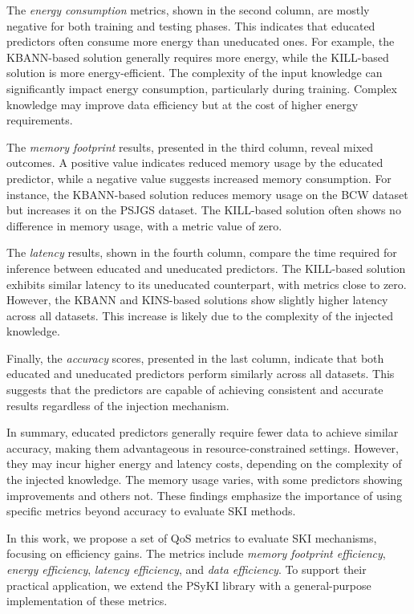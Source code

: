 The \emph{energy consumption} metrics, shown in the second column, are mostly negative for both training and testing phases.
%
This indicates that educated predictors often consume more energy than uneducated ones.
%
For example, the \gls{KBANN}-based solution generally requires more energy, while the \gls{KILL}-based solution is more energy-efficient.
%
The complexity of the input knowledge can significantly impact energy consumption, particularly during training.
%
Complex knowledge may improve data efficiency but at the cost of higher energy requirements.

%
The \emph{memory footprint} results, presented in the third column, reveal mixed outcomes.
%
A positive value indicates reduced memory usage by the educated predictor, while a negative value suggests increased memory consumption.
%
For instance, the \gls{KBANN}-based solution reduces memory usage on the \gls{BCW} dataset but increases it on the \gls{PSJGS} dataset.
%
The \gls{KILL}-based solution often shows no difference in memory usage, with a metric value of zero.

%
The \emph{latency} results, shown in the fourth column, compare the time required for inference between educated and uneducated predictors.
%
The \gls{KILL}-based solution exhibits similar latency to its uneducated counterpart, with metrics close to zero.
%
However, the \gls{KBANN} and \gls{KINS}-based solutions show slightly higher latency across all datasets.
%
This increase is likely due to the complexity of the injected knowledge.

%
Finally, the \emph{accuracy} scores, presented in the last column, indicate that both educated and uneducated predictors perform similarly across all datasets.
%
This suggests that the predictors are capable of achieving consistent and accurate results regardless of the injection mechanism.

%
In summary, educated predictors generally require fewer data to achieve similar accuracy, making them advantageous in resource-constrained settings.
%
However, they may incur higher energy and latency costs, depending on the complexity of the injected knowledge.
%
The memory usage varies, with some predictors showing improvements and others not.
%
These findings emphasize the importance of using specific metrics beyond accuracy to evaluate \gls{SKI} methods.

%
In this work, we propose a set of \gls{QoS} metrics to evaluate \gls{SKI} mechanisms, focusing on efficiency gains.
%
The metrics include \emph{memory footprint efficiency}, \emph{energy efficiency}, \emph{latency efficiency}, and \emph{data efficiency}.
%
To support their practical application, we extend the \gls{PSyKI} library with a general-purpose implementation of these metrics.

